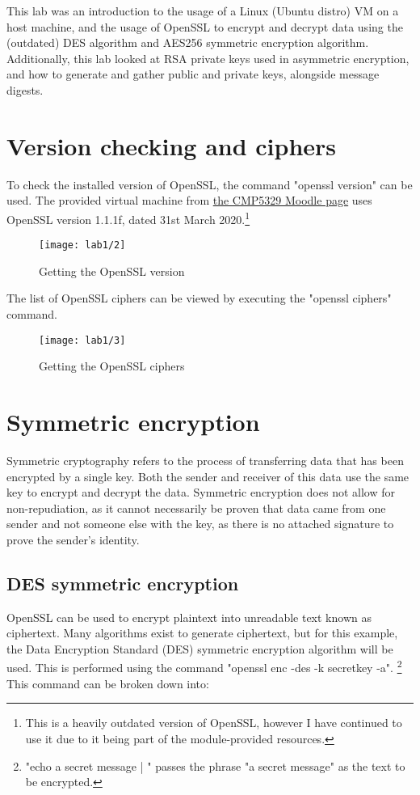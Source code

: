 This lab was an introduction to the usage of a Linux (Ubuntu distro) VM on a host machine, and the usage of OpenSSL to
encrypt and decrypt data using the (outdated) DES algorithm and AES256 symmetric encryption algorithm.
Additionally, this lab looked at RSA private keys used in asymmetric encryption, and how to generate and gather
public and private keys, alongside message digests.

\section{Version checking and ciphers}\label{sec:version}
To check the installed version of OpenSSL, the command "openssl version" can be used.
The provided virtual machine from \href{https://moodle.bcu.ac.uk/mod/url/view.php?id=7914090}{the CMP5329 Moodle page}
uses OpenSSL version 1.1.1f, dated 31st March 2020.\footnote{This is a heavily outdated version of OpenSSL,
    however I have continued to use it due to it being part of the module-provided resources.}

\begin{figure}[H]
    \centering
    \texttt{[image: lab1/2]}
    \caption{Getting the OpenSSL version}
    \label{fig:version}
\end{figure}

The list of OpenSSL ciphers can be viewed by executing the "openssl ciphers" command.

\begin{figure}[H]
    \centering
    \texttt{[image: lab1/3]}
    \caption{Getting the OpenSSL ciphers}
    \label{fig:ciphers}
\end{figure}

\section{Symmetric encryption}\label{sec:symmEncrypt}
Symmetric cryptography refers to the process of transferring data that has been encrypted by a single key.
Both the sender and receiver of this data use the same key to encrypt and decrypt the data.
Symmetric encryption does not allow for non-repudiation, as it cannot necessarily be proven that data came
from one sender and not someone else with the key, as there is no attached signature to prove the sender's
identity.

\subsection{DES symmetric encryption}\label{subsec:des}
OpenSSL can be used to encrypt plaintext into unreadable text known as ciphertext.
Many algorithms exist to generate ciphertext, but for this example, the Data Encryption Standard (DES)
symmetric encryption algorithm will be used.
This is performed using the command \newline"openssl enc -des -k secretkey -a".
\footnote{"echo a secret message | " passes the phrase "a secret message" as the text to be encrypted.}
This command can be broken down into:

